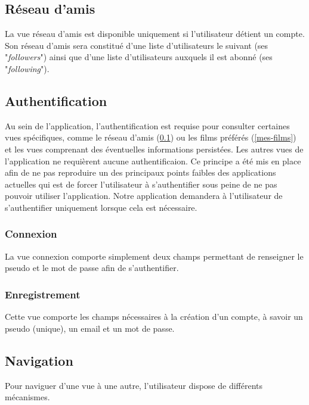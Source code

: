 
\subsection{Réseau d'amis}\label{reseau-amis}
La vue réseau d'amis est disponible uniquement si l'utilisateur détient un compte. Son réseau d'amis sera constitué d'une liste d'utilisateurs le suivant (ses "\textit{followers}") ainsi que d'une liste d'utilisateurs auxquels il est abonné (ses "\textit{following}").


\subsection{Authentification}

Au sein de l'application, l'authentification est requise pour consulter certaines vues spécifiques, comme le réseau d'amis (\ref{reseau-amis}) ou les films préférés (\ref{mes-films}) et les vues comprenant des éventuelles informations persistées.
Les autres vues de l'application ne requièrent aucune authentificaion. Ce principe a été mis en place afin de ne pas reproduire un des principaux points faibles des applications actuelles qui est de forcer l'utilisateur à s'authentifier sous peine de ne pas pouvoir utiliser l'application. Notre application demandera à l'utilisateur de s'authentifier uniquement lorsque cela est nécessaire.
 
\subsubsection{Connexion}
La vue connexion comporte simplement deux champs permettant de renseigner le pseudo et le mot de passe afin de s'authentifier.


\subsubsection{Enregistrement}
Cette vue comporte les champs nécessaires à la création d'un compte, à savoir un pseudo (unique), un email et un mot de passe.


\subsection{Navigation}
Pour naviguer d'une vue à une autre, l'utilisateur dispose de différents mécanismes.

